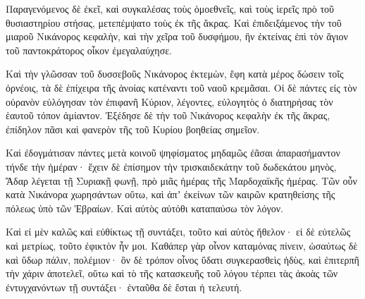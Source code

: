 {\par }{\PP {}Παραγενόμενος δὲ ἐκεῖ, καὶ συγκαλέσας τοὺς ὁμοεθνεῖς, καὶ τοὺς ἱερεῖς πρὸ τοῦ θυσιαστηρίου στήσας, μετεπέμψατο τοὺς ἐκ τῆς ἄκρας.
Καὶ ἐπιδειξάμενος τὴν τοῦ μιαροῦ Νικάνορος κεφαλὴν, καὶ τὴν χεῖρα τοῦ δυσφήμου, ἣν ἐκτείνας ἐπὶ τὸν ἅγιον τοῦ παντοκράτορος οἶκον ἐμεγαλαύχησε.
\par }{\PP {}Καὶ τὴν γλῶσσαν τοῦ δυσσεβοῦς Νικάνορος ἐκτεμὼν, ἔφη κατὰ μέρος δώσειν τοῖς ὀρνέοις, τὰ δὲ ἐπίχειρα τῆς ἀνοίας κατέναντι τοῦ ναοῦ κρεμᾶσαι.
Οἱ δὲ πάντες εἰς τὸν οὐρανὸν εὐλόγησαν τὸν ἐπιφανῆ Κύριον, λέγοντες, εὐλογητὸς ὁ διατηρήσας τὸν ἑαυτοῦ τόπον ἀμίαντον.
Ἐξέδησε δὲ τὴν τοῦ Νικάνορος κεφαλὴν ἐκ τῆς ἄκρας, ἐπίδηλον πᾶσι καὶ φανερὸν τῆς τοῦ Κυρίου βοηθείας σημεῖον.
\par }{\PP {}Καὶ ἐδογμάτισαν πάντες μετὰ κοινοῦ ψηφίσματος μηδαμῶς ἐᾶσαι ἀπαρασήμαντον τήνδε τὴν ἡμέραν· ἔχειν δὲ ἐπίσημον τὴν τρισκαιδεκάτην τοῦ δωδεκάτου μηνὸς, Ἄδαρ λέγεται τῇ Συριακῇ φωνῇ, πρὸ μιᾶς ἡμέρας τῆς Μαρδοχαϊκῆς ἡμέρας.
Τῶν οὖν κατὰ Νικάνορα χωρησάντων οὕτω, καὶ ἀπʼ ἐκείνων τῶν καιρῶν κρατηθείσης τῆς πόλεως ὑπὸ τῶν Ἑβραίων. Καὶ αὐτὸς αὐτόθι καταπαύσω τὸν λόγον.
\par }{\PP {}Καὶ εἰ μὲν καλῶς καὶ εὐθίκτως τῇ συντάξει, τοῦτο καὶ αὐτὸς ἤθελον· εἰ δὲ εὐτελῶς καὶ μετρίως, τοῦτο ἐφικτὸν ἦν μοι.
Καθάπερ γὰρ οἶνον καταμόνας πίνειν, ὡσαύτως δὲ καὶ ὕδωρ πάλιν, πολέμιον· ὃν δὲ τρόπον οἶνος ὕδατι συγκερασθεὶς ἡδὺς, καὶ ἐπιτερπῆ τὴν χάριν ἀποτελεῖ, οὕτω καὶ τὸ τῆς κατασκευῆς τοῦ λόγου τέρπει τὰς ἀκοὰς τῶν ἐντυγχανόντων τῇ συντάξει· ἐνταῦθα δὲ ἔσται ἡ τελευτή.
\par }